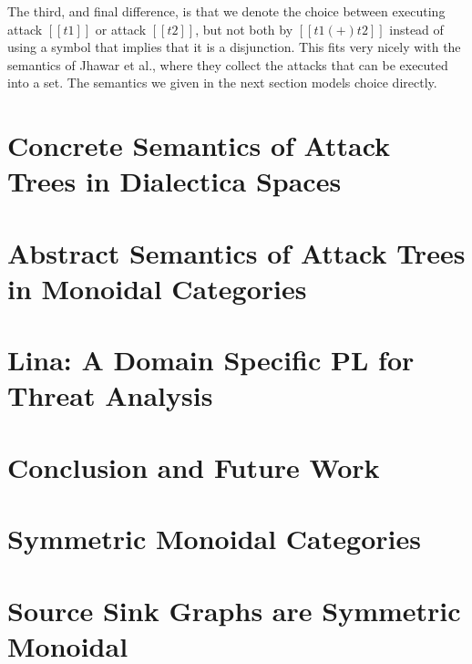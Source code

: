 \documentclass{llncs}
\begin{document}
The third, and final difference, is that we denote the choice between
executing attack $[[t1]]$ or attack $[[t2]]$, but not both by $[[t1
    (+) t2]]$ instead of using a symbol that implies that it is a
disjunction.  This fits very nicely with the semantics of Jhawar et
al., where they collect the attacks that can be executed into a set.
The semantics we given in the next section models choice directly.

\section{Concrete Semantics of Attack Trees in Dialectica Spaces}
\label{sec:concrete_semantics_of_attack_trees_in_dialectica_spaces}


\section{Abstract Semantics of Attack Trees in Monoidal Categories}
\label{sec:abstract_semantics_of_attack_trees_in_monoidal_categories}


\section{Lina: A Domain Specific PL for Threat Analysis}
\label{sec:lina:_a_domain_specific_pl_for_threat_analysis}


\section{Conclusion and Future Work}
\label{sec:conclusion_and_future_work}



 

\appendix

\section{Symmetric Monoidal Categories}
\label{sec:symmetric_monoidal_categories}



\section{Source Sink Graphs are Symmetric Monoidal}
\label{sec:source_sink_graphs_are_symmetric_monoidal}

\end{document}
